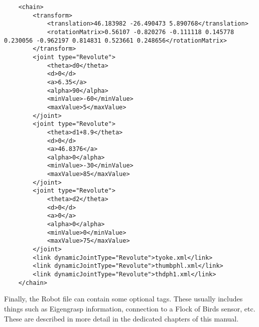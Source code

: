 \begin{verbatim}
    <chain>
        <transform>
            <translation>46.183982 -26.490473 5.890768</translation>
            <rotationMatrix>0.56107 -0.820276 -0.111118 0.145778 0.230056 -0.962197 0.814831 0.523661 0.248656</rotationMatrix>
        </transform>
        <joint type="Revolute">
            <theta>d0</theta>
            <d>0</d>
            <a>6.35</a>
            <alpha>90</alpha>
            <minValue>-60</minValue>
            <maxValue>5</maxValue>
        </joint>
        <joint type="Revolute">
            <theta>d1+8.9</theta>
            <d>0</d>
            <a>46.8376</a>
            <alpha>0</alpha>
            <minValue>-30</minValue>
            <maxValue>85</maxValue>
        </joint>
        <joint type="Revolute">
            <theta>d2</theta>
            <d>0</d>
            <a>0</a>
            <alpha>0</alpha>
            <minValue>0</minValue>
            <maxValue>75</maxValue>
        </joint>
        <link dynamicJointType="Revolute">tyoke.xml</link>
        <link dynamicJointType="Revolute">thumbphl.xml</link>
        <link dynamicJointType="Revolute">thdph1.xml</link>
    </chain>
\end{verbatim}

Finally, the Robot file can contain some optional tags. These usually
includes things such as Eigengrasp information, connection to a Flock
of Birds sensor, etc. These are described in more detail in the
dedicated chapters of this manual.
